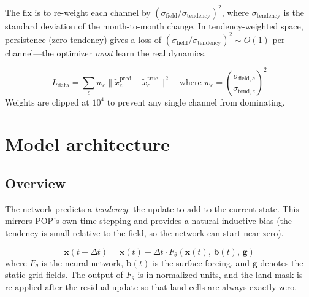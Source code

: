 \documentclass[11pt]{article}
\begin{document}
The fix is to re-weight each channel by $(\sigma_\text{field}/\sigma_\text{tendency})^2$,
where $\sigma_\text{tendency}$ is the standard deviation of the month-to-month
change. In tendency-weighted space, persistence (zero tendency) gives a
loss of $(\sigma_\text{field}/\sigma_\text{tendency})^2 \sim O(1)$ per
channel---the optimizer \emph{must} learn the real dynamics.

\begin{equation}
L_\text{data}
= \sum_c w_c\|\tilde{x}_c^{\text{pred}} - \tilde{x}_c^{\text{true}}\|^2
\quad\text{where }
w_c = \left(\frac{\sigma_{\text{field},c}}{\sigma_{\text{tend},c}}\right)^2
\end{equation}
Weights are clipped at $10^4$ to prevent any single channel from dominating.

\section{Model architecture}
\label{sec:arch}

\subsection{Overview}
The network predicts a \emph{tendency}: the update to add to the current state.
This mirrors POP's own time-stepping and provides a natural inductive bias (the
tendency is small relative to the field, so the network can start near zero).

\begin{equation}
\mathbf{x}(t+\Delta t) = \mathbf{x}(t) + \Delta t\cdot F_\theta\!\left(\mathbf{x}(t),\,\mathbf{b}(t),\,\mathbf{g}\right)
\label{eq:residual}
\end{equation}
where $F_\theta$ is the neural network, $\mathbf{b}(t)$ is the surface forcing,
and $\mathbf{g}$ denotes the static grid fields. The output of $F_\theta$
is in normalized units, and the land mask is re-applied after the residual
update so that land cells are always exactly zero.
\end{document}
